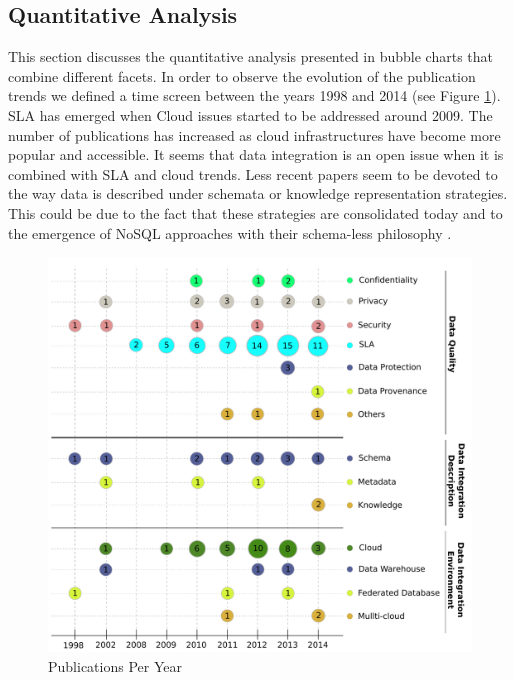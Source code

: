
\subsection{Quantitative Analysis}\label{sec:qanalysis}

This section discusses the quantitative analysis  presented in bubble charts that combine different facets. 
In order to observe the evolution of the publication trends we defined a time screen between the years 1998 and 2014 (see Figure \ref{fig:pubperyear}). SLA has emerged when Cloud issues started to be addressed around 2009. The number of publications has increased as cloud infrastructures have become more popular and accessible. It seems  that data integration is an open issue when it is combined with SLA and cloud trends. Less recent papers seem to be devoted to the way data is described under schemata or knowledge representation strategies. This could be due to the fact that these strategies are consolidated today and  to the emergence of NoSQL approaches with their schema-less philosophy \cite{sadalage2012nosql}. 

\begin{figure}[ht!]
\centering
\includegraphics[scale=0.33]{figs/bubble-charts/PublicationsPerYear.pdf} 
\caption{Publications Per Year}\label{fig:pubperyear}
\end{figure}

